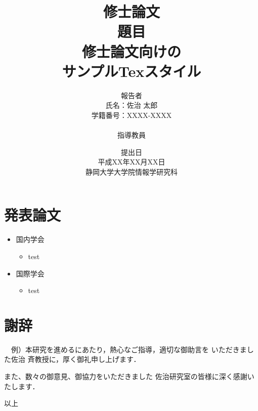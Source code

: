 \documentclass[a4j,12pt]{jreport}	%
\renewcommand{\bibname}{参考文献}
\begin{document}
\title{
修士論文\\
\vspace{30pt}
題目\\
修士論文向けの\\
サンプルTexスタイル\\
\vspace{60pt}
}
\author{
報告者\\
氏名：佐治 太郎\\
学籍番号：XXXX-XXXX\\
\\
指導教員\\
\vspace{30pt}
}
\date{
提出日\\
平成XX年XX月XX日\\
静岡大学大学院情報学研究科\\
}
\maketitle


\setcounter{tocdepth}{3}	%
\tableofcontents			%

 




\chapter*{発表論文}				%

\begin{itemize}
\item 国内学会
\begin{itemize}
\item test
\end{itemize}
\item 国際学会
\begin{itemize}
\item test
\end{itemize}
\end{itemize}

\clearpage

\renewcommand{\bibname}{参考文献}



\chapter*{謝辞}				%

　例）本研究を進めるにあたり，熱心なご指導，適切な御助言を
いただきました佐治 斉教授に，厚く御礼申し上げます．

また、数々の御意見、御協力をいただきました
佐治研究室の皆様に深く感謝いたします．

\begin{flushright}以上\end{flushright}	%
\end{document}

